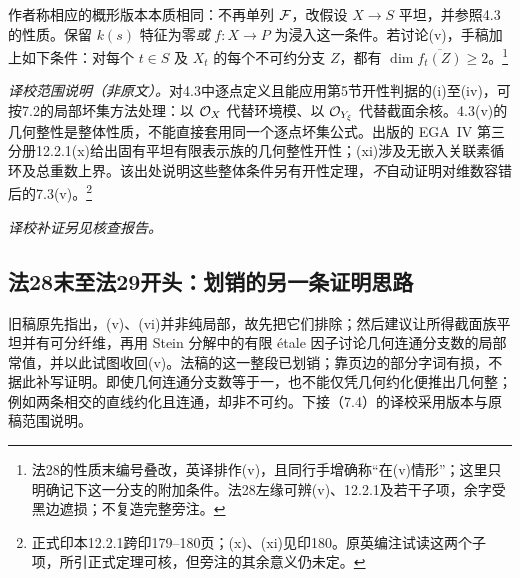 作者称相应的概形版本本质相同：不再单列 $\mathcal F$，改假设 $X\to S$ 平坦，并参照4.3的性质。保留 $k(s)$ 特征为零\emph{或} $f:X\to P$ 为浸入这一条件。若讨论(v)，手稿加上如下条件：对每个 $t\in S$ 及 $X_t$ 的每个不可约分支 $Z$，都有 $\dim\overline{f_t(Z)}\ge2$。\footnote{法28的性质末编号叠改，英译排作(v)，且同行手增确称“在(v)情形”；这里只明确记下这一分支的附加条件。法28左缘可辨(v)、12.2.1及若干子项，余字受黑边遮损；不复造完整旁注。}

\par\noindent\textit{译校范围说明（非原文）。}对4.3中逐点定义且能应用第5节开性判据的(i)至(iv)，可按7.2的局部坏集方法处理：以 $\mathcal O_X$ 代替环境模、以 $\mathcal O_{Y_\xi}$ 代替截面余核。4.3(v)的几何整性是整体性质，不能直接套用同一个逐点坏集公式。出版的 EGA~IV 第三分册12.2.1(x)给出固有平坦有限表示族的几何整性开性；(xi)涉及无嵌入关联素循环及总重数上界。该出处说明这些整体条件另有开性定理，\emph{不}自动证明对维数容错后的7.3(v)。\footnote{正式印本12.2.1跨印179--180页；(x)、(xi)见印180。原英编注试读这两个子项，所引正式定理可核，但旁注的其余意义仍未定。}

\par\noindent\textit{译校补证另见核查报告。}
\subsection*{法28末至法29开头：划销的另一条证明思路}
旧稿原先指出，(v)、(vi)并非纯局部，故先把它们排除；然后建议让所得截面族平坦并有可分纤维，再用 Stein 分解中的有限 étale 因子讨论几何连通分支数的局部常值，并以此试图收回(v)。法稿的这一整段已划销；靠页边的部分字词有损，不据此补写证明。即使几何连通分支数等于一，也不能仅凭几何约化便推出几何整；例如两条相交的直线约化且连通，却非不可约。下接（7.4）的译校采用版本与原稿范围说明。

\endgroup

